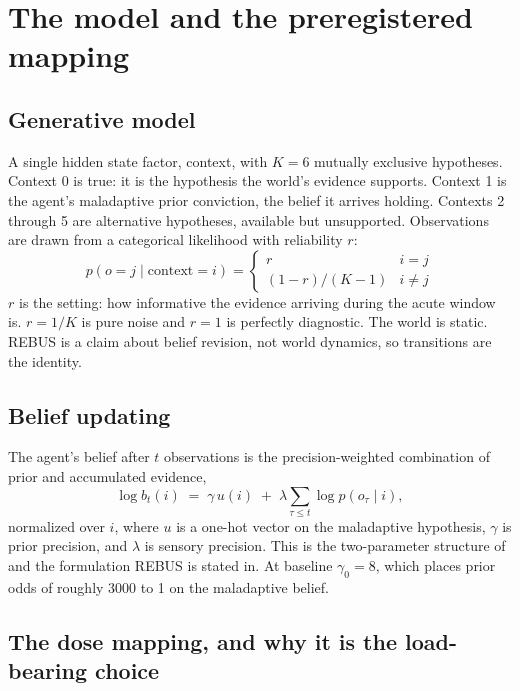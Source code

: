 \documentclass[11pt]{article}
\begin{document}
\section{The model and the preregistered mapping}
\label{sec:model}

\subsection{Generative model}

A single hidden state factor, context, with $K = 6$ mutually exclusive hypotheses.
Context 0 is true: it is the hypothesis the world's evidence supports. Context 1 is
the agent's maladaptive prior conviction, the belief it arrives holding. Contexts 2
through 5 are alternative hypotheses, available but unsupported. Observations are
drawn from a categorical likelihood with reliability $r$:
\begin{equation}
p(o = j \mid \text{context} = i) = \begin{cases} r & i = j \\ (1-r)/(K-1) & i \neq j
\end{cases}
\end{equation}
$r$ is the setting: how informative the evidence arriving during the acute window is.
$r = 1/K$ is pure noise and $r = 1$ is perfectly diagnostic. The world is static.
REBUS is a claim about belief revision, not world dynamics, so transitions are the
identity.

\subsection{Belief updating}

The agent's belief after $t$ observations is the precision-weighted combination of
prior and accumulated evidence,
\begin{equation}
\log b_t(i) \;=\; \gamma \, u(i) \;+\; \lambda \sum_{\tau \le t} \log p(o_\tau \mid i),
\label{eq:update}
\end{equation}
normalized over $i$, where $u$ is a one-hot vector on the maladaptive hypothesis,
$\gamma$ is prior precision, and $\lambda$ is sensory precision. This is the
two-parameter structure of \cite{rajpal2022} and the formulation REBUS is stated in.
At baseline $\gamma_0 = 8$, which places prior odds of roughly 3000 to 1 on the
maladaptive belief.

\subsection{The dose mapping, and why it is the load-bearing choice}
\end{document}
